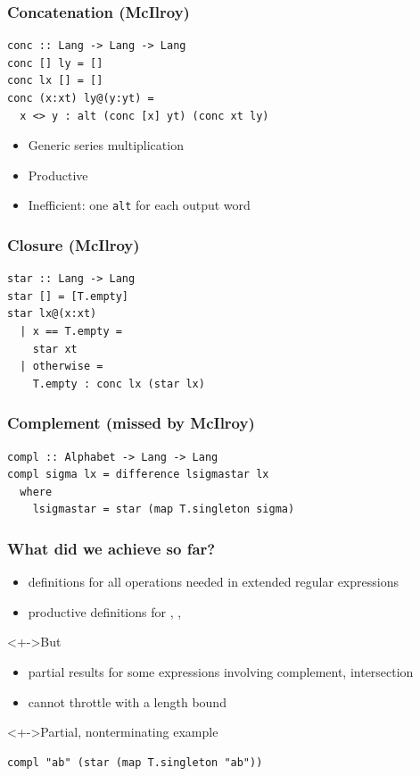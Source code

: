 \documentclass[pdftex,aspectratio=169]{beamer}
\begin{document}
\begin{frame}[fragile]
  \frametitle{Concatenation (McIlroy)}
\begin{lstlisting}[numbers=none]
conc :: Lang -> Lang -> Lang
conc [] ly = []
conc lx [] = []
conc (x:xt) ly@(y:yt) =
  x <> y : alt (conc [x] yt) (conc xt ly)
\end{lstlisting}
  \begin{itemize}
  \item Generic series multiplication
  \item Productive
  \item Inefficient: one \lstinline{alt} for each output word
  \end{itemize}
\end{frame}

\begin{frame}
  \frametitle{Closure (McIlroy)}
\begin{lstlisting}[numbers=none]
star :: Lang -> Lang
star [] = [T.empty]
star lx@(x:xt)
  | x == T.empty =
    star xt
  | otherwise =
    T.empty : conc lx (star lx)
\end{lstlisting}
\end{frame}

\begin{frame}[fragile]
  \frametitle{Complement (missed by McIlroy)}
\begin{lstlisting}[numbers=none]
compl :: Alphabet -> Lang -> Lang
compl sigma lx = difference lsigmastar lx
  where
    lsigmastar = star (map T.singleton sigma)
\end{lstlisting}
\end{frame}

\begin{frame}[fragile]
  \frametitle{What did we achieve so far?}
  \begin{itemize}
  \item<+-> definitions for all operations needed in extended regular expressions
  \item<+-> productive definitions for , , 
  \end{itemize}
  \begin{block}<+->{But}
    \begin{itemize}
    \item partial results for some expressions involving complement, intersection
    \item cannot throttle with a length bound
    \end{itemize}
  \end{block}
  \begin{exampleblock}<+->{Partial, nonterminating example}
\begin{lstlisting}[numbers=none]
compl "ab" (star (map T.singleton "ab"))
\end{lstlisting}
  \end{exampleblock}
\end{frame}
\end{document}
